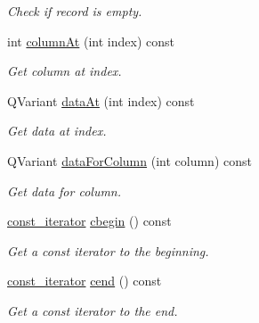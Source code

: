 \begin{DoxyCompactItemize}
\begin{DoxyCompactList}\small\item\em Check if record is empty. \end{DoxyCompactList}\item 
int \hyperlink{class_mdt_1_1_item_model_1_1_key_record_aa9204cfa1c581162f6b55fc653928ae6}{column\+At} (int index) const 
\begin{DoxyCompactList}\small\item\em Get column at index. \end{DoxyCompactList}\item 
Q\+Variant \hyperlink{class_mdt_1_1_item_model_1_1_key_record_ab0bd9a1db87aaf33e93bc17ac4bc9b3d}{data\+At} (int index) const 
\begin{DoxyCompactList}\small\item\em Get data at index. \end{DoxyCompactList}\item 
Q\+Variant \hyperlink{class_mdt_1_1_item_model_1_1_key_record_a71fd979069805084a0ccd4e60101a885}{data\+For\+Column} (int column) const 
\begin{DoxyCompactList}\small\item\em Get data for column. \end{DoxyCompactList}\item 
\hyperlink{class_mdt_1_1_item_model_1_1_key_record_af1d11bf9db822ef3c493c9ad89677289}{const\+\_\+iterator} \hyperlink{class_mdt_1_1_item_model_1_1_key_record_ae0d2415108e13947b61f3d43890d3b7e}{cbegin} () const \hypertarget{class_mdt_1_1_item_model_1_1_key_record_ae0d2415108e13947b61f3d43890d3b7e}{}\label{class_mdt_1_1_item_model_1_1_key_record_ae0d2415108e13947b61f3d43890d3b7e}

\begin{DoxyCompactList}\small\item\em Get a const iterator to the beginning. \end{DoxyCompactList}\item 
\hyperlink{class_mdt_1_1_item_model_1_1_key_record_af1d11bf9db822ef3c493c9ad89677289}{const\+\_\+iterator} \hyperlink{class_mdt_1_1_item_model_1_1_key_record_a66ead2ec0034613edd8749f404c1cfe7}{cend} () const \hypertarget{class_mdt_1_1_item_model_1_1_key_record_a66ead2ec0034613edd8749f404c1cfe7}{}\label{class_mdt_1_1_item_model_1_1_key_record_a66ead2ec0034613edd8749f404c1cfe7}

\begin{DoxyCompactList}\small\item\em Get a const iterator to the end. \end{DoxyCompactList}\end{DoxyCompactItemize}


